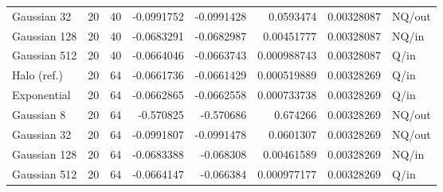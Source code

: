 \documentclass[fleqn,usenatbib]{mnras}
\begin{document}
\begin{table}
\begin{tabular}{lrrrrrrl}
Gaussian 32 & 20 & 40 & -0.0991752 & -0.0991428 & 0.0593474 & 0.00328087 & NQ/out \\
Gaussian 128 & 20 & 40 & -0.0683291 & -0.0682987 & 0.00451777 & 0.00328087 & NQ/in \\
Gaussian 512 & 20 & 40 & -0.0664046 & -0.0663743 & 0.000988743 & 0.00328087 & Q/in \\
Halo (ref.) & 20 & 64 & -0.0661736 & -0.0661429 & 0.000519889 & 0.00328269 & Q/in \\
Exponential & 20 & 64 & -0.0662865 & -0.0662558 & 0.000733738 & 0.00328269 & Q/in \\
Gaussian 8 & 20 & 64 & -0.570825 & -0.570686 & 0.674266 & 0.00328269 & NQ/out \\
Gaussian 32 & 20 & 64 & -0.0991807 & -0.0991478 & 0.0601307 & 0.00328269 & NQ/out \\
Gaussian 128 & 20 & 64 & -0.0683388 & -0.068308 & 0.00461589 & 0.00328269 & NQ/in \\
Gaussian 512 & 20 & 64 & -0.0664147 & -0.066384 & 0.000977177 & 0.00328269 & Q/in \\
\bottomrule
\end{tabular}
\end{table}
\end{document}
